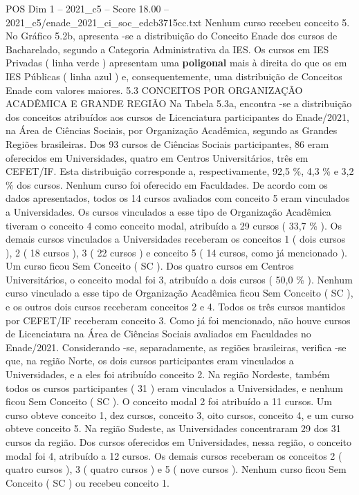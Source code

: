 \begin{textsample}{POS Dim 1 – 2021\_c5 – Score 18.00 – 2021\_c5/enade\_2021\_ci\_soc\_edcb3715cc.txt}
Nenhum curso recebeu conceito 5.
No Gráfico 5.2b, apresenta -se a distribuição do Conceito Enade dos cursos de Bacharelado, segundo a Categoria Administrativa da IES.
Os cursos em IES Privadas ( linha verde ) apresentam uma \textbf{poligonal} mais à direita do que os em IES Públicas ( linha azul ) e, consequentemente, uma distribuição de Conceitos Enade com valores maiores. 5.3 CONCEITOS POR ORGANIZAÇÃO ACADÊMICA E GRANDE REGIÃO Na Tabela 5.3a, encontra -se a distribuição dos conceitos atribuídos aos cursos de Licenciatura participantes do Enade/2021, na Área de Ciências Sociais, por Organização Acadêmica, segundo as Grandes Regiões brasileiras.
Dos 93 cursos de Ciências Sociais participantes, 86 eram oferecidos em Universidades, quatro em Centros Universitários, três em CEFET/IF.
Esta distribuição corresponde a, respectivamente, 92,5 \%, 4,3 \% e 3,2 \% dos cursos.
Nenhum curso foi oferecido em Faculdades.
De acordo com os dados apresentados, todos os 14 cursos avaliados com conceito 5 eram vinculados a Universidades.
Os cursos vinculados a esse tipo de Organização Acadêmica tiveram o conceito 4 como conceito modal, atribuído a 29 cursos ( 33,7 \% ).
Os demais cursos vinculados a Universidades receberam os conceitos 1 ( dois cursos ), 2 ( 18 cursos ), 3 ( 22 cursos ) e conceito 5 ( 14 cursos, como já mencionado ).
Um curso ficou Sem Conceito ( SC ).
Dos quatro cursos em Centros Universitários, o conceito modal foi 3, atribuído a dois cursos ( 50,0 \% ).
Nenhum curso vinculado a esse tipo de Organização Acadêmica ficou Sem Conceito ( SC ), e os outros dois cursos receberam conceitos 2 e 4.
Todos os três cursos mantidos por CEFET/IF receberam conceito 3.
Como já foi mencionado, não houve cursos de Licenciatura na Área de Ciências Sociais avaliados em Faculdades no Enade/2021.
Considerando -se, separadamente, as regiões brasileiras, verifica -se que, na região Norte, os dois cursos participantes eram vinculados a Universidades, e a eles foi atribuído conceito 2.
Na região Nordeste, também todos os cursos participantes ( 31 ) eram vinculados a Universidades, e nenhum ficou Sem Conceito ( SC ).
O conceito modal 2 foi atribuído a 11 cursos.
Um curso obteve conceito 1, dez cursos, conceito 3, oito cursos, conceito 4, e um curso obteve conceito 5.
Na região Sudeste, as Universidades concentraram 29 dos 31 cursos da região.
Dos cursos oferecidos em Universidades, nessa região, o conceito modal foi 4, atribuído a 12 cursos.
Os demais cursos receberam os conceitos 2 ( quatro cursos ), 3 ( quatro cursos ) e 5 ( nove cursos ).
Nenhum curso ficou Sem Conceito ( SC ) ou recebeu conceito 1.

\end{textsample}

